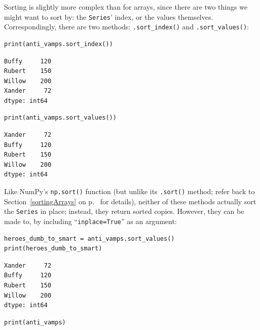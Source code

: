 Sorting is slightly more complex than for arrays, since there are two things we
might want to sort by: the \texttt{Series}' index, or the values themselves.
Correspondingly, there are two methods: \texttt{.sort\_index()} and
\texttt{.sort\_values()}:

\begin{Verbatim}[fontsize=\small,samepage=true,frame=single,framesep=3mm]
print(anti_vamps.sort_index())
\end{Verbatim}
\vspace{-.3in}

\begin{Verbatim}[fontsize=\small,samepage=true,frame=leftline,framesep=5mm,framerule=1mm]
Buffy     120
Rubert    150
Willow    200
Xander     72
dtype: int64
\end{Verbatim}

\begin{Verbatim}[fontsize=\small,samepage=true,frame=single,framesep=3mm]
print(anti_vamps.sort_values())
\end{Verbatim}
\vspace{-.3in}

\begin{Verbatim}[fontsize=\small,samepage=true,frame=leftline,framesep=5mm,framerule=1mm]
Xander     72
Buffy     120
Rubert    150
Willow    200
dtype: int64
\end{Verbatim}

Like NumPy's \texttt{np.sort()} function (but unlike its \texttt{.sort()}
method; refer back to Section~\ref{sortingArrays} on p.~\pageref{sortingArrays}
for details), neither of these methods actually sort the \texttt{Series} in
place; instead, they return sorted copies. However, they can be made to, by
including ``\texttt{inplace=True}'' as an argument:

\begin{Verbatim}[fontsize=\small,samepage=true,frame=single,framesep=3mm]
heroes_dumb_to_smart = anti_vamps.sort_values()
print(heroes_dumb_to_smart)
\end{Verbatim}
\vspace{-.3in}

\begin{Verbatim}[fontsize=\small,samepage=true,frame=leftline,framesep=5mm,framerule=1mm]
Xander     72
Buffy     120
Rubert    150
Willow    200
dtype: int64
\end{Verbatim}

\begin{Verbatim}[fontsize=\small,samepage=true,frame=single,framesep=3mm]
print(anti_vamps)
\end{Verbatim}
\vspace{-.3in}

